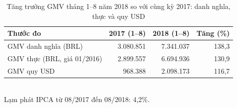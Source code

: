 \begin{table}[htbp]\centering\scriptsize\caption{Tăng trưởng GMV tháng 1–8 năm 2018 so với cùng kỳ 2017: danh nghĩa, thực và quy USD}\label{tab:api-growth}
\begin{tabular}{lrrr}\toprule
\textbf{Thước đo} & \textbf{2017 (1–8)} & \textbf{2018 (1–8)} & \textbf{Tăng (\%)} \\\midrule
GMV danh nghĩa (BRL) & 3.080.851 & 7.341.037 & 138,3 \\
GMV thực (BRL, giá 01/2016) & 2.899.557 & 6.694.936 & 130,9 \\
GMV quy USD & 968.388 & 2.098.173 & 116,7 \\
\bottomrule\end{tabular}\\[2pt]{\footnotesize Lạm phát IPCA từ 08/2017 đến 08/2018: 4,2\%.}
\end{table}
